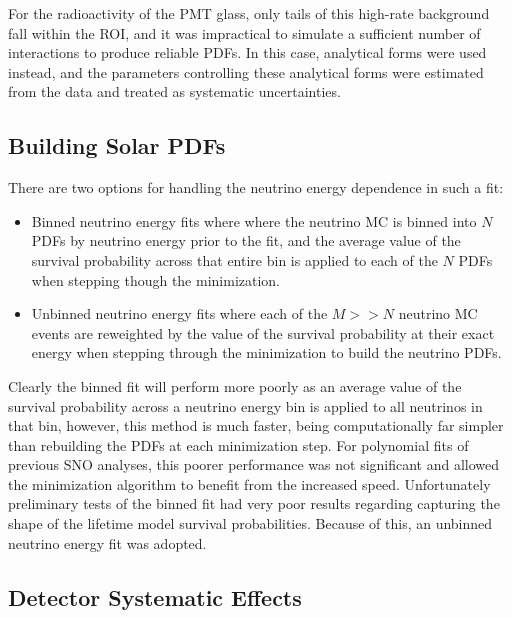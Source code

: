 For the radioactivity of the PMT glass, only tails of this high-rate background fall within the ROI, and it was impractical to simulate a sufficient number of interactions to produce reliable PDFs.
In this case, analytical forms were used instead, and the parameters controlling these analytical forms were estimated from the data and treated as systematic uncertainties.

\subsection{Building Solar PDFs}

There are two options for handling the neutrino energy dependence in such a fit:
\begin{itemize}
\item Binned neutrino energy fits where where the neutrino MC is binned into $N$ PDFs by neutrino energy prior to the fit, and the average value of the survival probability across that entire bin is applied to each of the $N$ PDFs when stepping though the minimization.
\item Unbinned neutrino energy fits where each of the $M >> N$ neutrino MC events are reweighted by the value of the survival probability at their exact energy when stepping through the minimization to build the neutrino PDFs.
\end{itemize}
Clearly the binned fit will perform more poorly as an average value of the survival probability across a neutrino energy bin is applied to all neutrinos in that bin, however, this method is much faster, being computationally far simpler than rebuilding the PDFs at each minimization step. 
For polynomial fits of previous SNO analyses, this poorer performance was not significant and allowed the minimization algorithm to benefit from the increased speed.
Unfortunately preliminary tests of the binned fit had very poor results regarding capturing the shape of the lifetime model survival probabilities.
Because of this, an unbinned neutrino energy fit was adopted.

\subsection{Detector Systematic Effects}
\label{systematics} 

